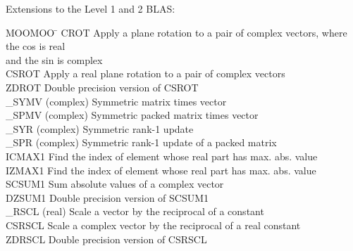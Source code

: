 \noindent
Extensions to the Level 1 and 2 BLAS:
\begin{tabbing}
MOOMOO \= \kill
CROT  \> Apply a plane rotation to a pair of complex vectors, where the cos is real \\
      \> and the sin is complex \\
CSROT \> Apply a real plane rotation to a pair of complex vectors \\
ZDROT \> Double precision version of CSROT \\
\_SYMV \> (complex) Symmetric matrix times vector \\
\_SPMV \> (complex) Symmetric packed matrix times vector \\
\_SYR  \> (complex) Symmetric rank-1 update \\
\_SPR  \> (complex) Symmetric rank-1 update of a packed matrix \\
ICMAX1 \> Find the index of element whose real part has max. abs. value \\
IZMAX1 \> Find the index of element whose real part has max. abs. value \\
SCSUM1 \> Sum absolute values of a complex vector \\
DZSUM1 \> Double precision version of SCSUM1 \\
\_RSCL  \> (real) Scale a vector by the reciprocal of a constant \\
CSRSCL \> Scale a complex vector by the reciprocal of a real constant \\
ZDRSCL \> Double precision version of CSRSCL
\end{tabbing}

